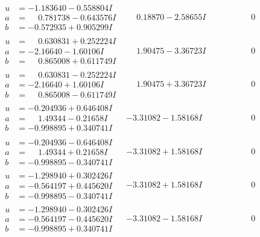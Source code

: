 \documentclass[1p]{elsarticle_modified}
\theoremstyle{definition}
\begin{document}
$$\begin{array}{c|c|c}
\begin{aligned}
u &= -1.183640 - 0.558804 I \\
a &= \phantom{-}0.781738 - 0.643576 I \\
b &= -0.572935 + 0.905299 I\end{aligned}
 & \phantom{-}0.18870 - 2.58655 I & \phantom{-0.000000 } 0 \\ \hline\begin{aligned}
u &= \phantom{-}0.630831 + 0.252224 I \\
a &= -2.16640 - 1.60106 I \\
b &= \phantom{-}0.865008 + 0.611749 I\end{aligned}
 & \phantom{-}1.90475 - 3.36723 I & \phantom{-0.000000 } 0 \\ \hline\begin{aligned}
u &= \phantom{-}0.630831 - 0.252224 I \\
a &= -2.16640 + 1.60106 I \\
b &= \phantom{-}0.865008 - 0.611749 I\end{aligned}
 & \phantom{-}1.90475 + 3.36723 I & \phantom{-0.000000 } 0 \\ \hline\begin{aligned}
u &= -0.204936 + 0.646408 I \\
a &= \phantom{-}1.49344 - 0.21658 I \\
b &= -0.998895 + 0.340741 I\end{aligned}
 & -3.31082 - 1.58168 I & \phantom{-0.000000 } 0 \\ \hline\begin{aligned}
u &= -0.204936 - 0.646408 I \\
a &= \phantom{-}1.49344 + 0.21658 I \\
b &= -0.998895 - 0.340741 I\end{aligned}
 & -3.31082 + 1.58168 I & \phantom{-0.000000 } 0 \\ \hline\begin{aligned}
u &= -1.298940 + 0.302426 I \\
a &= -0.564197 + 0.445620 I \\
b &= -0.998895 - 0.340741 I\end{aligned}
 & -3.31082 + 1.58168 I & \phantom{-0.000000 } 0 \\ \hline\begin{aligned}
u &= -1.298940 - 0.302426 I \\
a &= -0.564197 - 0.445620 I \\
b &= -0.998895 + 0.340741 I\end{aligned}
 & -3.31082 - 1.58168 I & \phantom{-0.000000 } 0 \\ \hline\begin{aligned}

\end{aligned}
\end{array}$$
\end{document}
